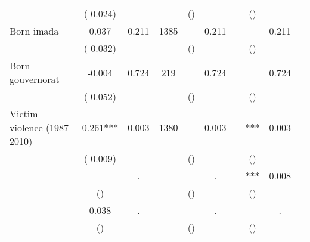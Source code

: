 \begin{tabular}{l*{9}{c}}
                               &        (       0.024) & &                                                                        &       () & &                                                         &       () & &                                         \\ 
 Born imada                        &              0.037                &        0.211 & 1385                &        &        0.211 &                        &  &        0.211 &                              \\ 
                               &        (       0.032) & &                                                                        &       () & &                                                         &       () & &                                         \\ 
 Born gouvernorat                        &             -0.004                &        0.724 & 219                &        &        0.724 &                        &  &        0.724 &                              \\ 
                               &        (       0.052) & &                                                                        &       () & &                                                         &       () & &                                         \\ 
 Victim violence (1987-2010)                        &              0.261***                 &        0.003 & 1380                &        &        0.003 &                        & *** &        0.003 &                                \\ 
                               &        (       0.009) & &                                                                        &       () & &                                                         &       () & &                                         \\ 
                         &                       &            . &                 &        &            . &                        & *** &        0.008 &                                  \\ 
                               &        () & &                                                                        &       () & &                                                         &       () & &                                         \\ 
                         &              0.038                 &            . &                 &        &            . &                        &  &            . &                              \\ 
                               &        () & &                                                                        &       () & &                                                         &       () & &                                         \\ 
\hline \end{tabular}                                                                                                                                                      